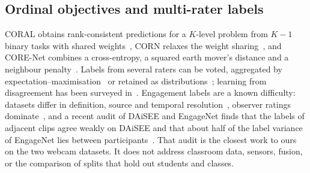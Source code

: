 \subsection{Ordinal objectives and multi-rater labels}
CORAL obtains rank-consistent predictions for a $K$-level problem from $K-1$ binary tasks with shared weights~\cite{cao2020coral}, CORN relaxes the weight sharing~\cite{shi2023deep}, and CORE-Net combines a cross-entropy, a squared earth mover's distance and a neighbour penalty~\cite{tran2026ordinal}. Labels from several raters can be voted, aggregated by expectation--maximisation~\cite{dawid1979em} or retained as distributions~\cite{geng2016ldl}; learning from disagreement has been surveyed in~\cite{uma2021learning}. Engagement labels are a known difficulty: datasets differ in definition, source and temporal resolution~\cite{khan2022inconsistencies}, observer ratings dominate~\cite{karimah2022automatic}, and a recent audit of DAiSEE and EngageNet finds that the labels of adjacent clips agree weakly on DAiSEE and that about half of the label variance of EngageNet lies between participants~\cite{le2026auditing}. That audit is the closest work to ours on the two webcam datasets. It does not address classroom data, sensors, fusion, or the comparison of splits that hold out students and classes.

